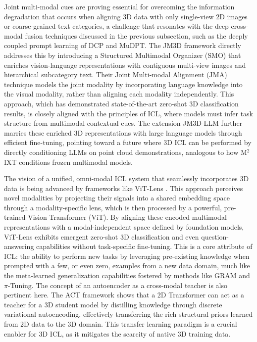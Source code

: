 \documentclass[11pt]{article}
\begin{document}
Joint multi-modal cues are proving essential for overcoming the information degradation that occurs when aligning 3D data with only single-view 2D images or coarse-grained text categories, a challenge that resonates with the deep cross-modal fusion techniques discussed in the previous subsection, such as the deeply coupled prompt learning of DCP and MuDPT. The JM3D framework \cite{ref257} directly addresses this by introducing a Structured Multimodal Organizer (SMO) that enriches vision-language representations with contiguous multi-view images and hierarchical subcategory text. Their Joint Multi-modal Alignment (JMA) technique models the joint modality by incorporating language knowledge into the visual modality, rather than aligning each modality independently. This approach, which has demonstrated state-of-the-art zero-shot 3D classification results, is closely aligned with the principles of ICL, where models must infer task structure from multimodal contextual cues. The extension JM3D-LLM further marries these enriched 3D representations with large language models through efficient fine-tuning, pointing toward a future where 3D ICL can be performed by directly conditioning LLMs on point cloud demonstrations, analogous to how M\(^2\)IXT conditions frozen multimodal models.

The vision of a unified, omni-modal ICL system that seamlessly incorporates 3D data is being advanced by frameworks like ViT-Lens \cite{ref258}. This approach perceives novel modalities by projecting their signals into a shared embedding space through a modality-specific lens, which is then processed by a powerful, pre-trained Vision Transformer (ViT). By aligning these encoded multimodal representations with a modal-independent space defined by foundation models, ViT-Lens exhibits emergent zero-shot 3D classification and even question-answering capabilities without task-specific fine-tuning. This is a core attribute of ICL: the ability to perform new tasks by leveraging pre-existing knowledge when prompted with a few, or even zero, examples from a new data domain, much like the meta-learned generalization capabilities fostered by methods like GRAM and \(\pi\)-Tuning. The concept of an autoencoder as a cross-modal teacher is also pertinent here. The ACT framework \cite{ref259} shows that a 2D Transformer can act as a teacher for a 3D student model by distilling knowledge through discrete variational autoencoding, effectively transferring the rich structural priors learned from 2D data to the 3D domain. This transfer learning paradigm is a crucial enabler for 3D ICL, as it mitigates the scarcity of native 3D training data.
\end{document}
